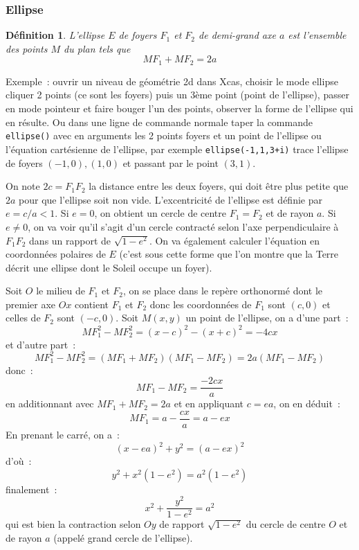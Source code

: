 \documentclass[a4paper,11pt]{article}
\newtheorem{defn}[thm]{D\'efinition}
\begin{document}
\begin{giacjshere}
\subsubsection{Ellipse}
\begin{defn}
L'ellipse $E$ de foyers $F_1$ et $F_2$ de demi-grand axe
$a$ est l'ensemble des points $M$ du plan tels que 
\[ MF_1+MF_2=2a\]
\end{defn}
Exemple~: ouvrir un niveau de g\'eom\'etrie 2d dans Xcas,
choisir le mode ellipse cliquer 2 points (ce sont les foyers)
puis un 3\`eme point (point de l'ellipse), passer en mode
pointeur et faire bouger l'un des points, observer la forme
de l'ellipse qui en r\'esulte. Ou dans une ligne de commande
normale taper la commande \verb|ellipse()| avec
en arguments les 2 points foyers et un point de l'ellipse
ou l'\'equation cart\'esienne de l'ellipse, par exemple
\verb|ellipse(-1,1,3+i)| trace l'ellipse de foyers $(-1,0), (1,0)$
et passant par le point $(3,1)$.

On note $2c=F_1F_2$ la distance entre les deux foyers, qui doit \^etre
plus petite que $2a$ pour que l'ellipse soit non vide.
L'excentricit\'e de l'ellipse est d\'efinie par $e=c/a < 1$. Si $e=0$,
on obtient un cercle de centre $F_1=F_2$ et de rayon $a$. Si $e\neq 0$,
on va voir qu'il s'agit d'un cercle contracté
selon l'axe perpendiculaire \`a $F_1F_2$ dans un rapport de 
$\sqrt{1-e^2}$. On va \'egalement calculer l'\'equation en
coordonn\'ees polaires de $E$ (c'est sous cette forme
que l'on montre que la Terre d\'ecrit une ellipse 
dont le Soleil occupe un foyer).

Soit $O$ le milieu de $F_1$ et $F_2$, on se place dans le rep\`ere 
orthonorm\'e
dont le premier axe $Ox$ contient $F_1$ et $F_2$ donc les
coordonn\'ees de $F_1$ sont $(c,0)$ et celles de $F_2$ sont $(-c,0)$. 
Soit $M(x,y)$ un
point de l'ellipse, on a d'une part~:
\[ MF_1^2 - MF_2^2 = (x-c)^2-(x+c)^2 = -4cx \]
et d'autre part~:
\[ MF_1^2 - MF_2^2 = (MF_1 + MF_2)(MF_1 - MF_2 ) = 2a (MF_1 - MF_2 )\]
donc~:
\[ MF_1 - MF_2 = \frac{-2cx}{a} \]
en additionnant avec $MF_1+MF_2=2a$ et en appliquant $c=ea$, on en d\'eduit~:
\begin{equation} \label{eq:MF1}
 MF_1 = a - \frac{cx}{a} = a-ex 
\end{equation}
En prenant le carr\'e, on a~:
\[ (x-ea)^2 + y^2 = (a-ex)^2\]
d'o\`u~:
\[ y^2 + x^2 (1-e^2) = a^2(1-e^2) \]
finalement~:
\[ x^2 + \frac{y^2}{1-e^2} = a^2 \]
qui est bien la contraction selon $Oy$ de rapport $\sqrt{1-e^2}$ du
cercle de centre $O$ et de rayon $a$ (appel\'e grand cercle de
l'ellipse).


\end{giacjshere}
\end{document}
